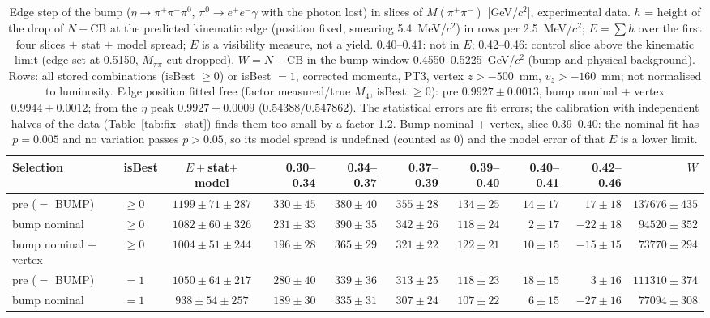 \begin{table}[H]
\centering\scriptsize
\setlength{\tabcolsep}{2pt}
\caption{Edge step of the bump ($\eta\to\pi^+\pi^-\pi^0$, $\pi^0\to e^+e^-\gamma$ with the photon lost) in slices of $M(\pi^+\pi^-)$ [GeV/$c^2$], experimental data. $h$ = height of the drop of $N-\mathrm{CB}$ at the predicted kinematic edge (position fixed, smearing 5.4~MeV/$c^2$) in rows per 2.5~MeV/$c^2$; $E=\sum h$ over the first four slices $\pm$ stat $\pm$ model spread; $E$ is a visibility measure, not a yield. 0.40--0.41: not in $E$; 0.42--0.46: control slice above the kinematic limit (edge set at 0.5150, $M_{\pi\pi}$ cut dropped). $W=N-\mathrm{CB}$ in the bump window 0.4550--0.5225~GeV/$c^2$ (bump and physical background). Rows: all stored combinations (isBest $\geq0$) or isBest $=1$, corrected momenta, PT3, vertex $z>-500$~mm, $v_z>-160$~mm; not normalised to luminosity. Edge position fitted free (factor measured/true $M_4$, isBest $\geq0$): pre $0.9927\pm0.0013$, bump nominal + vertex $0.9944\pm0.0012$; from the $\eta$ peak $0.9927\pm0.0009$ ($0.54388/0.547862$). The statistical errors are fit errors; the calibration with independent halves of the data (Table~\ref{tab:fix_stat}) finds them too small by a factor 1.2. Bump nominal + vertex, slice 0.39--0.40: the nominal fit has $p=0.005$ and no variation passes $p>0.05$, so its model spread is undefined (counted as 0) and the model error of that $E$ is a lower limit.}
\label{tab:res_bump}
\begin{tabular}{llcrrrrrrr}
\toprule
Selection & isBest & $E\pm$stat$\pm$model & 0.30--0.34 & 0.34--0.37 & 0.37--0.39 & 0.39--0.40 & 0.40--0.41 & 0.42--0.46 & $W$ \\
\midrule
pre ($=$ BUMP) & $\geq0$ & $1199\pm71\pm287$ & $330\pm45$ & $380\pm40$ & $355\pm28$ & $134\pm25$ & $14\pm17$ & $17\pm18$ & $137676\pm435$ \\
bump nominal & $\geq0$ & $1082\pm60\pm326$ & $231\pm33$ & $390\pm35$ & $342\pm26$ & $118\pm24$ & $2\pm17$ & $-22\pm18$ & $94520\pm352$ \\
bump nominal + vertex & $\geq0$ & $1004\pm51\pm244$ & $196\pm28$ & $365\pm29$ & $321\pm22$ & $122\pm21$ & $10\pm15$ & $-15\pm15$ & $73770\pm294$ \\
\addlinespace
pre ($=$ BUMP) & $=1$ & $1050\pm64\pm217$ & $280\pm40$ & $339\pm36$ & $313\pm25$ & $118\pm23$ & $18\pm15$ & $3\pm16$ & $111310\pm374$ \\
bump nominal & $=1$ & $938\pm54\pm257$ & $189\pm30$ & $335\pm31$ & $307\pm24$ & $107\pm22$ & $6\pm15$ & $-27\pm16$ & $77094\pm308$ \\

\end{tabular}
\end{table}
